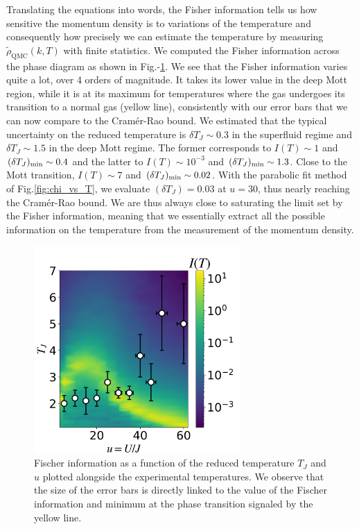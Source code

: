 \noindent Translating the equations into words, the Fisher information tells us how sensitive the momentum density is to variations of the temperature and consequently how precisely we can estimate the temperature by measuring  $\tilde{\rho}_{\mathrm{QMC}}(k, T)$ with finite statistics. We computed the Fisher information across the phase diagram as shown in Fig.-\ref{fig:fisher_info}. We see that the Fisher information varies quite a lot, over 4 orders of magnitude. It takes its lower value in the deep Mott region, while it is at its maximum for temperatures where the gas undergoes its transition to a normal gas (yellow line), consistently with our error bars that we can now compare to the Cramér-Rao bound. We estimated that the typical uncertainty on the reduced temperature is $\delta T_J  \sim 0.3$ in the superfluid regime and $\delta T_J  \sim 1.5$ in the deep Mott regime. The former corresponds to $I(T) \sim 1$ and $(\delta T_J)_{\rm{min}} \sim 0.4$ and the latter to  $I(T) \sim 10^{-3}$ and $(\delta T_J)_{\rm{min}} \sim 1.3$. Close to the Mott transition, $I(T) \sim 7$ and $(\delta T_J)_{\rm{min}} \sim 0.02$. With the parabolic fit method of Fig.\ref{fig:chi_vs_T}, we evaluate $(\delta T_J)=0.03$ at $u=30$, thus nearly reaching the Cramér-Rao bound. We are thus always close to saturating the limit set by the Fisher information, meaning that we essentially extract all the possible information on the temperature from the measurement of the momentum density.

\begin{figure}
    \centering
    \includegraphics[width=0.7\textwidth]{Fig/Chapter3/fisher_info.png}
    \caption[Fischer information as a function of the reduced temperature $T_J$ and $u$]{Fischer information as a function of the reduced temperature $T_J$ and $u$ plotted alongside the experimental temperatures. We observe that the size of the error bars is directly linked to the value of the Fischer information and minimum at the phase transition signaled by the yellow line.}
    \label{fig:fisher_info}
\end{figure}


